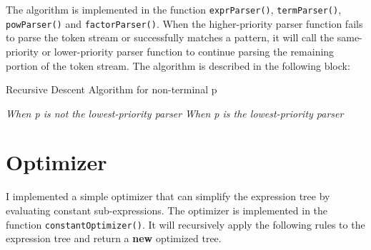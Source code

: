 \documentclass[a4paper,oneside]{book}
\begin{document}
The algorithm is implemented in the function \verb|exprParser()|, \verb|termParser()|, \verb|powParser()| and \verb|factorParser()|. When the higher-priority parser function fails to parse the token stream or successfully matches a pattern, it will call the same-priority or lower-priority parser function to continue parsing the remaining portion of the token stream. The algorithm is described in the following block:

\begin{algorithm}[H]
    \caption{Recursive Descent Algorithm for non-terminal p}\label{alg:2}
    \DontPrintSemicolon
    \BlankLine
    \emph{When p is not the lowest-priority parser}\;
    \BlankLine
    \emph{When p is the lowest-priority parser}\;

\end{algorithm}

\section{Optimizer}

I implemented a simple optimizer that can simplify the expression tree by evaluating constant sub-expressions. The optimizer is implemented in the function \verb|constantOptimizer()|. It will recursively apply the following rules to the expression tree and return a \textbf{new} optimized tree.
\end{document}
